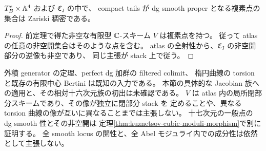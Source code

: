 \begin{corollary}
\label{thm:seed-smooth-points-dense}
$T_B^e\times\mathbb A^4$ および $\mathfrak C_{\mathrm J}$ の中で、
compact tails が dg smooth proper となる複素点の集合は Zariski 稠密である。
\end{corollary}
\begin{proof}
前定理で得た非空な有限型 $\mathbb C$-スキーム $V$ は複素点を持つ。
従って atlas の任意の非空開集合はそのような点を含む。
atlas の全射性から、$\mathfrak C_{\mathrm J}$ の非空開部分の逆像も非空であり、
同じ主張が stack 上で従う。
\end{proof}

\begin{remark}[結論の範囲と既知入力]
外積 generator の定理、perfect dg 加群の filtered colimit、
楕円曲線の torsion と既存の有限中心 Bertini は既知の入力である。
本節の具体的な Jacobian 族への適用と、その相対十六次元族の初出は未確認である。
$V$ は atlas 内の局所閉部分スキームであり、その像が独立に閉部分 stack を
定めることや、異なる torsion 曲線の像が互いに異なることまでは主張しない。
十七次元の一般点の dg smooth 性とその非空開は
定理\ref{thm:kuznetsov-cubic-moduli-morphism}で別に証明する。
全 smooth locus の開性と、全 Abel モジュライ内での成分性は依然として主張しない。
\end{remark}
